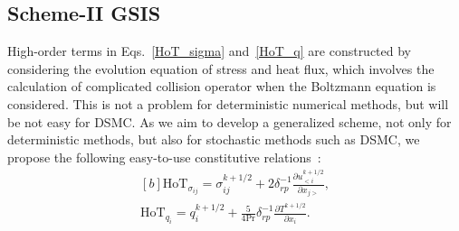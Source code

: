 


\subsection{Scheme-II GSIS}

High-order terms in Eqs.~\eqref{HoT_sigma} and~\eqref{HoT_q} are constructed by considering the evolution equation of stress and heat flux, which involves the calculation of complicated collision operator when the Boltzmann equation is considered. This is not a problem for deterministic numerical methods, but will be not easy for DSMC. 
As we aim to develop a generalized scheme, not only for deterministic methods, but also for stochastic methods such as DSMC, we propose the following easy-to-use constitutive relations~\cite{Zhu2021JCP}: 
\begin{equation}\label{hotdiffint}
\begin{aligned}[b]
\text{HoT}_{\sigma_{ij}} = \sigma^{k+1/2}_{ij} +2\delta_{rp}^{-1}\frac{\partial u^{k+1/2}_{<i}}{\partial {x_{j>}}},\\
\text{HoT}_{q_i} = q_i^{k+1/2} +\frac{5}{4\mathrm{Pr}}\delta_{rp}^{-1} \frac{\partial T^{k+1/2}}{\partial x_i}.
\end{aligned}
\end{equation}








